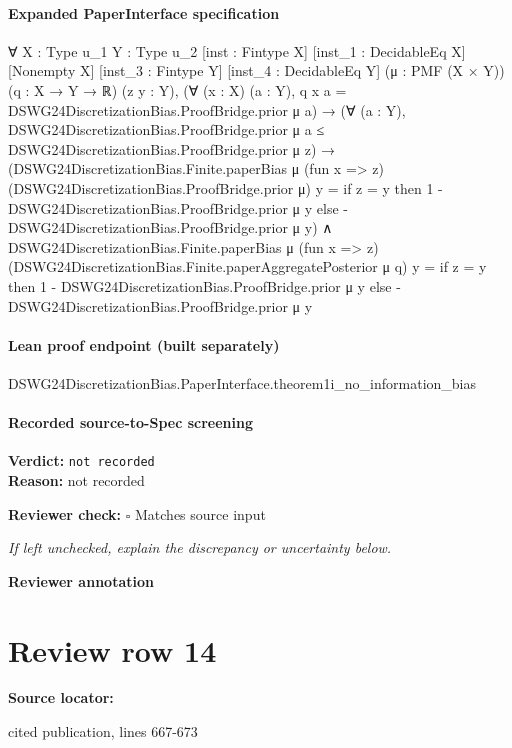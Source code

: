 \documentclass[10pt]{article}
\newcommand{\reviewerbox}{%
  \par\noindent\fbox{\parbox{0.96\linewidth}{\rule{0pt}{0.38in}}}\par
}
\newcommand{\reviewmatch}[1]{%
  \par\noindent\textbf{Reviewer check:} $\square$\; #1\par
  \noindent\emph{If left unchecked, explain the discrepancy or uncertainty below.}\par
}
\begin{document}
\paragraph{Expanded PaperInterface specification}
\begin{ReviewVerbatim}
∀ {X : Type u_1} {Y : Type u_2} [inst : Fintype X] [inst_1 : DecidableEq X] [Nonempty X] [inst_3 : Fintype Y]
  [inst_4 : DecidableEq Y] (μ : PMF (X × Y)) (q : X → Y → ℝ) (z y : Y),
  (∀ (x : X) (a : Y), q x a = DSWG24DiscretizationBias.ProofBridge.prior μ a) →
    (∀ (a : Y), DSWG24DiscretizationBias.ProofBridge.prior μ a ≤ DSWG24DiscretizationBias.ProofBridge.prior μ z) →
      (DSWG24DiscretizationBias.Finite.paperBias μ (fun x => z) (DSWG24DiscretizationBias.ProofBridge.prior μ) y =
          if z = y then 1 - DSWG24DiscretizationBias.ProofBridge.prior μ y
          else -DSWG24DiscretizationBias.ProofBridge.prior μ y) ∧
        DSWG24DiscretizationBias.Finite.paperBias μ (fun x => z)
            (DSWG24DiscretizationBias.Finite.paperAggregatePosterior μ q) y =
          if z = y then 1 - DSWG24DiscretizationBias.ProofBridge.prior μ y
          else -DSWG24DiscretizationBias.ProofBridge.prior μ y
\end{ReviewVerbatim}

\paragraph{Lean proof endpoint (built separately)}\begin{ReviewVerbatim}
DSWG24DiscretizationBias.PaperInterface.theorem1i_no_information_bias
\end{ReviewVerbatim}

\paragraph{Recorded source-to-Spec screening}
\textbf{Verdict:} \texttt{not recorded}
\\
\textbf{Reason:} not recorded
\reviewmatch{Matches source input}
\noindent\textbf{Reviewer annotation}\par
\reviewerbox
\clearpage
\hypertarget{source-claim-d8ad786b7cc58022}{}
\section*{Review row 14}
\textbf{Source locator:} {\footnotesize\raggedright cited publication, lines 667-\allowbreak{}673\par}
\end{document}
